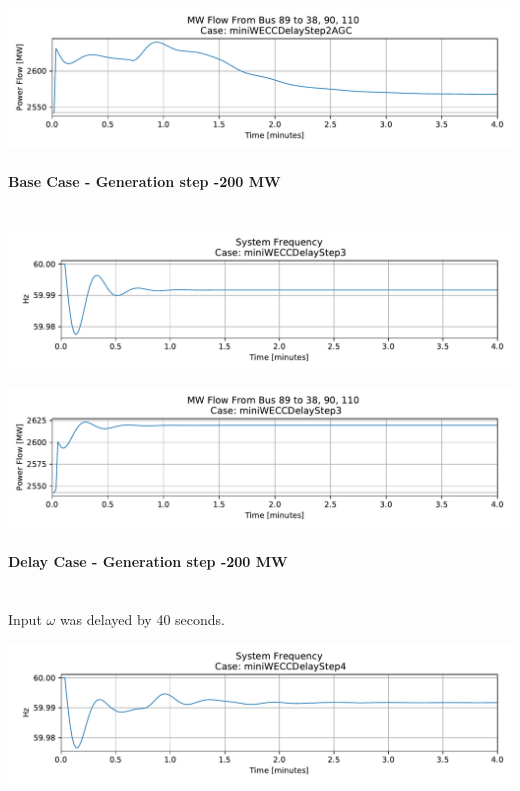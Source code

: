 \documentclass[12pt]{article}
\begin{document}
\includegraphics[width=\linewidth]{figures/miniWECCDelayStep2AGCMWflow89to38-90-110}

\pagebreak

\paragraph{Base Case - Generation step -200 MW}\ \\

\includegraphics[width=\linewidth]{figures/miniWECCDelayStep3Freq}

\includegraphics[width=\linewidth]{figures/miniWECCDelayStep3MWflow89to38-90-110}

\paragraph{Delay Case - Generation step -200 MW} \ \\
Input $ \omega$ was delayed by 40 seconds.

\includegraphics[width=\linewidth]{figures/miniWECCDelayStep4Freq}
\end{document}
